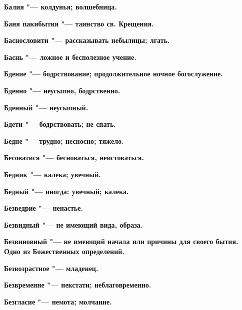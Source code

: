\bfseries Балия \normalfont{} "--- колдунья; волшебница. 




\bfseries Баня пакибытия \normalfont{} "--- таинство св. Крещения. 




\bfseries Баснословити \normalfont{} "--- рассказывать небылицы; лгать. 




\bfseries Баснь \normalfont{} "--- ложное и бесполезное учение. 




\bfseries Бдение \normalfont{} "--- бодрствование; продолжительное ночное богослужение. 




\bfseries Бденно \normalfont{} "--- неусыпно, бодрственно. 




\bfseries Бденный \normalfont{} "--- неусыпный. 




\bfseries Бдети \normalfont{} "--- бодрствовать; не спать. 




\bfseries Бедне \normalfont{} "--- трудно; несносно; тяжело. 




\bfseries Бесоватися \normalfont{} "--- бесноваться, неистоваться. 




\bfseries Бедник \normalfont{} "--- калека; увечный. 




\bfseries Бедный \normalfont{} "--- иногда: увечный; калека. 




\bfseries Безведрие \normalfont{} "--- ненастье. 




\bfseries Безвидный \normalfont{} "--- не имеющий вида, образа. 




\bfseries Безвиновный \normalfont{} "--- не имеющий начала или причины для своего бытия. Одно из Божественных определений. 




\bfseries Безвозрастное \normalfont{} "--- младенец. 




\bfseries Безвременне \normalfont{} "--- некстати; неблаговременно. 




\bfseries Безгласие \normalfont{} "--- немота; молчание. 




